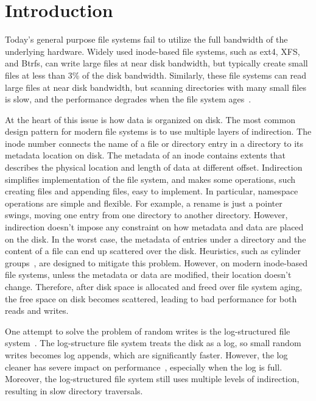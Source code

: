 \chapter{Introduction}
\label{chap:intro}

Today's general purpose file systems fail to utilize the full bandwidth of the
underlying hardware.
Widely used inode-based file systems, such as ext4, XFS, and Btrfs, can write
large files at near disk bandwidth,
but typically create small files at less than 3\% of the disk bandwidth.
Similarly, these file systems can read large files at near disk bandwidth,
but scanning directories with many small files is slow, and the performance
degrades when the file system ages~\citep{betrfs3}.

At the heart of this issue is how data is organized on disk.
The most common design pattern for modern file systems is to use multiple layers
of indirection.
The inode number connects the name of a file or directory entry in a directory
to its metadata location on disk.
The metadata of an inode contains extents that describes the physical location
and length of data at different offset.
Indirection simplifies implementation of the file system, and makes some
operations, such creating files and appending files, easy to implement.
In particular, namespace operations are simple and flexible.
For example, a rename is just a pointer swings, moving one entry from one
directory to another directory.
However, indirection doesn't impose any constraint on how metadata and data
are placed on the disk.
In the worst case, the metadata of entries under a directory and the content of
a file can end up scattered over the disk.
Heuristics, such as cylinder groups~\citep{ffs1}, are designed to mitigate this
problem.
However, on modern inode-based file systems, unless the metadata or data are
modified, their location doesn't change.
Therefore, after disk space is allocated and freed over file system aging,
the free space on disk becomes scattered,
leading to bad performance for both reads and writes.

One attempt to solve the problem of random writes is the log-structured file
system~\citep{lfs}.
The log-structure file system treats the disk as a log, so small random writes
becomes log appends, which are significantly faster.
However, the log cleaner has severe impact on performance~\citep{lfsbsd},
especially when the log is full.
Moreover, the log-structured file system still uses multiple levels of
indirection, resulting in slow directory traversals.

